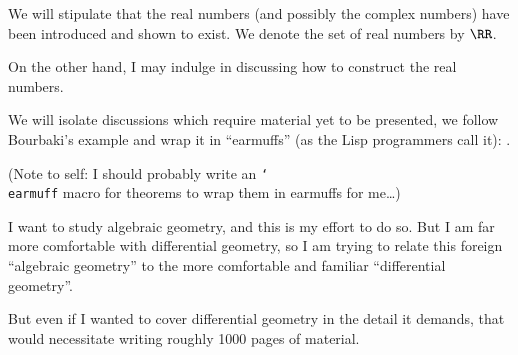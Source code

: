 \begin{remark}
We will stipulate that the real numbers (and possibly the complex
numbers) have been introduced and shown to exist. We denote the set of
real numbers by $\RR$.

On the other hand, I may indulge in discussing how to construct the
real numbers.
\end{remark}

\begin{remark}
We will isolate discussions which require material yet to be
presented, we follow Bourbaki's example and wrap it in ``earmuffs''
(as the Lisp programmers call it): \future{$\cdots$}.

(Note to self: I should probably write an \texttt{\char`\\earmuff} macro for
theorems to wrap them in earmuffs for me\dots)
\end{remark}

\begin{remark}
I want to study algebraic geometry, and this is my effort to do
so. But I am far more comfortable with differential geometry, so I am
trying to relate this foreign ``algebraic geometry'' to the more
comfortable and familiar ``differential geometry''.

But even if I wanted to cover differential geometry in the detail it
demands, that would necessitate writing roughly 1000 pages of
material. 
\end{remark}